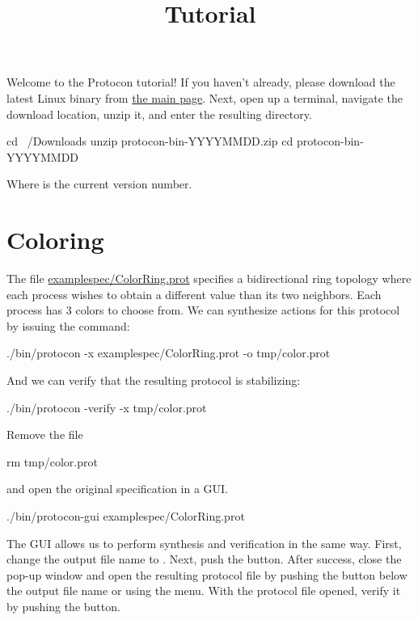 
\title{Tutorial}
\date{}



Welcome to the Protocon tutorial!
If you haven't already, please download the latest Linux binary from \href{index.html}{the main page}.
Next, open up a terminal, navigate the download location, unzip it, and enter the resulting directory.
\begin{code}
cd ~/Downloads
unzip protocon-bin-YYYYMMDD.zip
cd protocon-bin-YYYYMMDD
\end{code}
Where  is the current version number.



\section{Coloring}

The file \url{examplespec/ColorRing.prot} specifies a bidirectional ring topology where each process wishes to obtain a different value than its two neighbors.
Each process has $3$ colors to choose from.
We can synthesize actions for this protocol by issuing the command:
\begin{code}
./bin/protocon -x examplespec/ColorRing.prot -o tmp/color.prot
\end{code}
And we can verify that the resulting protocol is stabilizing:
\begin{code}
./bin/protocon -verify -x tmp/color.prot
\end{code}

Remove the file
\begin{code}
rm tmp/color.prot
\end{code}
and open the original specification in a GUI.
\begin{code}
./bin/protocon-gui examplespec/ColorRing.prot
\end{code}

The GUI allows us to perform synthesis and verification in the same way.
First, change the output file name to .
Next, push the  button.
After success, close the pop-up window and open the resulting protocol file by pushing the  button below the output file name or using the  menu.
With the protocol file opened, verify it by pushing the  button.

